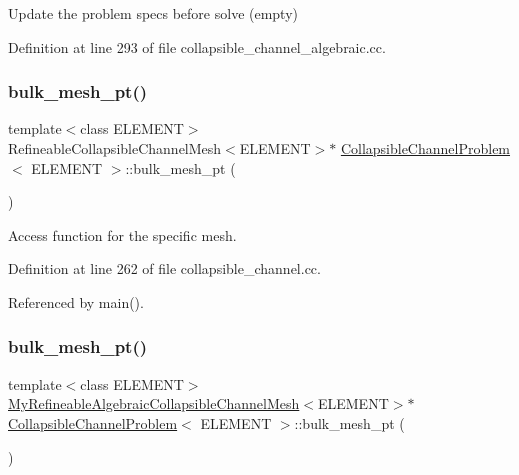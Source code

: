 Update the problem specs before solve (empty) 



Definition at line 293 of file collapsible\+\_\+channel\+\_\+algebraic.\+cc.

\mbox{\label{classCollapsibleChannelProblem_a49a428b5f489d11b3fb92199b72f6dd7}} 
\subsubsection{\texorpdfstring{bulk\+\_\+mesh\+\_\+pt()}{bulk\_mesh\_pt()}\hspace{0.1cm}{\footnotesize\ttfamily [1/3]}}
{\footnotesize\ttfamily template$<$class E\+L\+E\+M\+E\+NT$>$ \\
Refineable\+Collapsible\+Channel\+Mesh$<$E\+L\+E\+M\+E\+NT$>$$\ast$ \hyperlink{classCollapsibleChannelProblem}{Collapsible\+Channel\+Problem}$<$ E\+L\+E\+M\+E\+NT $>$\+::bulk\+\_\+mesh\+\_\+pt (\begin{DoxyParamCaption}{ }\end{DoxyParamCaption})\hspace{0.3cm}{\ttfamily [inline]}}



Access function for the specific mesh. 



Definition at line 262 of file collapsible\+\_\+channel.\+cc.



Referenced by main().

\mbox{\label{classCollapsibleChannelProblem_abe1a38b5c84188910435874511a877f6}} 
\subsubsection{\texorpdfstring{bulk\+\_\+mesh\+\_\+pt()}{bulk\_mesh\_pt()}\hspace{0.1cm}{\footnotesize\ttfamily [2/3]}}
{\footnotesize\ttfamily template$<$class E\+L\+E\+M\+E\+NT$>$ \\
\hyperlink{classoomph_1_1MyRefineableAlgebraicCollapsibleChannelMesh}{My\+Refineable\+Algebraic\+Collapsible\+Channel\+Mesh}$<$E\+L\+E\+M\+E\+NT$>$$\ast$ \hyperlink{classCollapsibleChannelProblem}{Collapsible\+Channel\+Problem}$<$ E\+L\+E\+M\+E\+NT $>$\+::bulk\+\_\+mesh\+\_\+pt (\begin{DoxyParamCaption}{ }\end{DoxyParamCaption})\hspace{0.3cm}{\ttfamily [inline]}}



